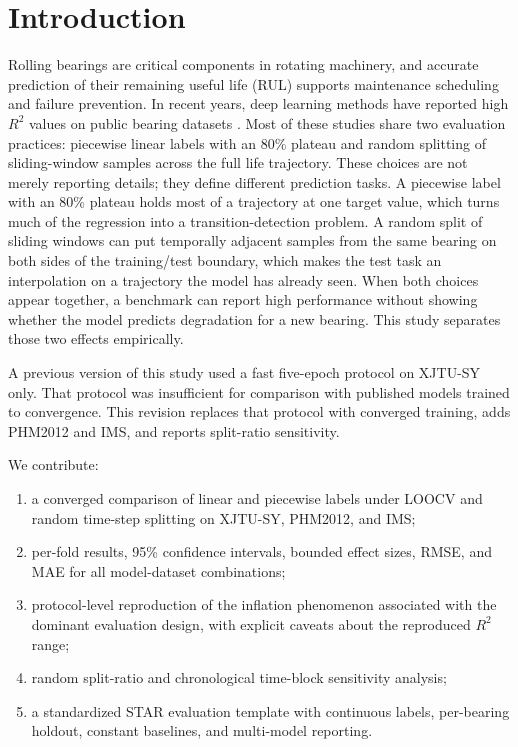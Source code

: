 \documentclass[5p,twocolumn]{elsarticle}
\begin{document}
\section{Introduction}
Rolling bearings are critical components in rotating machinery, and accurate prediction of their remaining useful life (RUL) supports maintenance scheduling and failure prevention. In recent years, deep learning methods have reported high $R^2$ values on public bearing datasets \cite{rul_lstm_uq_2022,reg_lstm_2021,gru_tim_2021,transformer_tim_2023}. Most of these studies share two evaluation practices: piecewise linear labels with an 80\% plateau and random splitting of sliding-window samples across the full life trajectory.
These choices are not merely reporting details; they define different prediction tasks. A piecewise label with an 80\% plateau holds most of a trajectory at one target value, which turns much of the regression into a transition-detection problem. A random split of sliding windows can put temporally adjacent samples from the same bearing on both sides of the training/test boundary, which makes the test task an interpolation on a trajectory the model has already seen. When both choices appear together, a benchmark can report high performance without showing whether the model predicts degradation for a new bearing. This study separates those two effects empirically.

A previous version of this study used a fast five-epoch protocol on XJTU-SY only. That protocol was insufficient for comparison with published models trained to convergence. This revision replaces that protocol with converged training, adds PHM2012 and IMS, and reports split-ratio sensitivity.

We contribute:
\begin{enumerate}
    \item a converged comparison of linear and piecewise labels under LOOCV and random time-step splitting on XJTU-SY, PHM2012, and IMS;
    \item per-fold results, 95\% confidence intervals, bounded effect sizes, RMSE, and MAE for all model-dataset combinations;
    \item protocol-level reproduction of the inflation phenomenon associated with the dominant evaluation design, with explicit caveats about the reproduced $R^2$ range;
    \item random split-ratio and chronological time-block sensitivity analysis;
    \item a standardized STAR evaluation template with continuous labels, per-bearing holdout, constant baselines, and multi-model reporting.
\end{enumerate}
\end{document}
